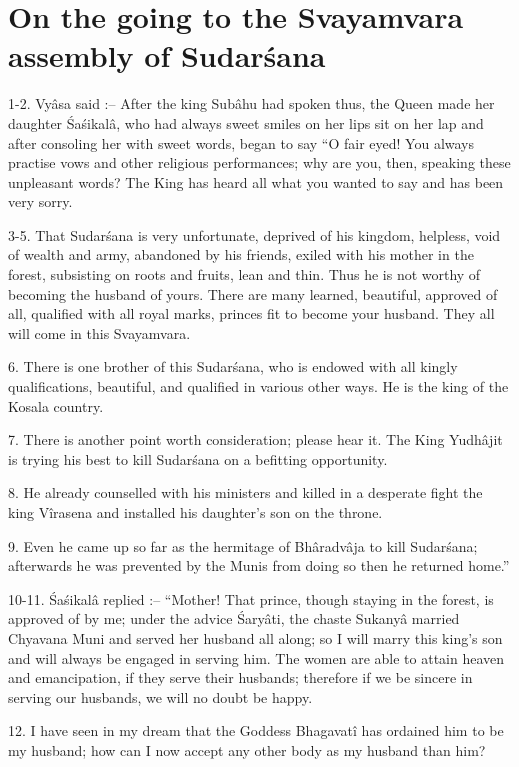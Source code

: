 ﻿\chapter{On the going to the Svayamvara assembly of Sudar\'sana}

1-2. Vy\^asa said :-- After the king Sub\^ahu had spoken thus, the Queen made her daughter \'Sa\'sikal\^a, who had always sweet smiles on her lips sit on her lap and after consoling her with sweet words, began to say ``O fair eyed! You always practise vows and other religious performances; why are you, then, speaking these unpleasant words? The King has heard all what you wanted to say and has been very sorry.

3-5. That Sudar\'sana is very unfortunate, deprived of his kingdom, helpless, void of wealth and army, abandoned by his friends, exiled with his mother in the forest, subsisting on roots and fruits, lean and thin. Thus he is not worthy of becoming the husband of yours. There are many learned, beautiful, approved of all, qualified with all royal marks, princes fit to become your husband. They all will come in this Svayamvara.

6. There is one brother of this Sudar\'sana, who is endowed with all kingly qualifications, beautiful, and qualified in various other ways. He is the king of the Kosala country.

7. There is another point worth consideration; please hear it. The King Yudh\^ajit is trying his best to kill Sudar\'sana on a befitting opportunity.

8. He already counselled with his ministers and killed in a desperate fight the king V\^irasena and installed his daughter's son on the throne.

9. Even he came up so far as the hermitage of Bh\^aradv\^aja to kill Sudar\'sana; afterwards he was prevented by the Munis from doing so then he returned home.''

10-11. \'Sa\'sikal\^a replied :-- ``Mother! That prince, though staying in the forest, is approved of by me; under the advice \'Sary\^ati, the chaste Sukany\^a married Chyavana Muni and served her husband all along; so I will marry this king's son and will always be engaged in serving him. The women are able to attain heaven and emancipation, if they serve their husbands; therefore if we be sincere in serving our husbands, we will no doubt be happy.

12. I have seen in my dream that the Goddess Bhagavat\^i has ordained him to be my husband; how can I now accept any other body as my husband than him?

